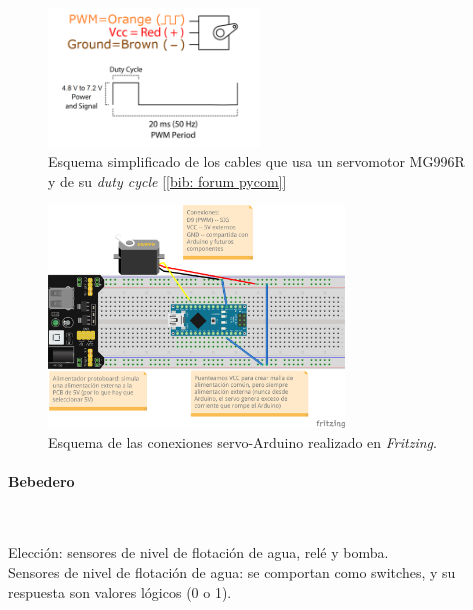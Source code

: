 \documentclass[12pt]{article}
\newcommand{\subsubsubsection}[1]{\paragraph{#1}\mbox{}\\}
\begin{document}
	\begin{figure}[h!]
		\begin{center}
			\includegraphics[width=0.5\textwidth]{img/servo_dutyCycle.png}
			\caption{Esquema simplificado de los cables que usa un servomotor MG996R y de su \textit{duty cycle} [\ref{bib: forum pycom}]}
			\label{Esquema conexiones servo}
		\end{center}
	\end{figure}
	
	\begin{figure}[h!]
		\begin{center}
			\includegraphics[width=0.7\textwidth]{img/servo_connections_v2_fritzing.png}
			\caption{Esquema de las conexiones servo-Arduino realizado en \textit{Fritzing}.}
			\label{Esquema conexiones servo Fritzing}
		\end{center}
	\end{figure}
	
	\pagebreak
	
	\subsubsubsection{Bebedero}
	\label{subsubsubsection: bebedero eleccion}
		
	\noindent Elección: sensores de nivel de flotación de agua, relé y bomba. \\
	
	\noindent Sensores de nivel de flotación de agua: se comportan como switches, y su respuesta son valores lógicos (0 o 1). \\
	 
\end{document}
